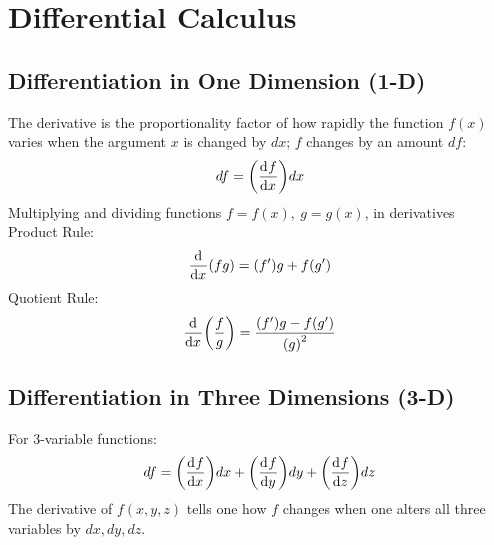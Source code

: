 \section{Differential Calculus}
    \subsection*{Differentiation in One Dimension (1-D)}
        The derivative is the proportionality factor of how rapidly the function \(f(x)\) varies when the argument \(x\) is changed by \(dx\); \(f\) changes by an amount \(df\):
        \begin{align*}
            df = \qty(\der{f}{x})dx
        \end{align*}
        Multiplying and dividing functions $f=f(x),~g=g(x)$, in derivatives 
        \\
        Product Rule:
        \begin{equation}
            \der{x}(fg)=(f')g+f(g')
        \end{equation}
        Quotient Rule:
        \begin{equation}
            \der{x}\qty(\frac{f}{g})=\frac{(f')g-f(g')}{{(g)}^2}
        \end{equation}
    \subsection*{Differentiation in Three Dimensions (3-D)}
        For 3-variable functions:
        \begin{align*}
            df =\qty(\der{f}{x})dx + \qty(\der{f}{y})dy + \qty(\der{f}{z})dz
        \end{align*}
        The derivative of \(f(x,y,z)\) tells one how \(f\) changes when one alters all three variables by \(dx, dy, dz\).

